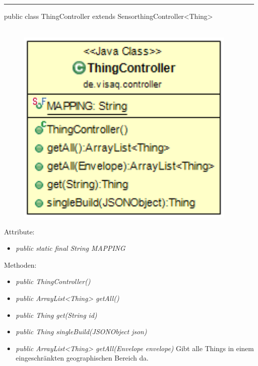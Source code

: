 \rule{\textwidth}{0.4pt}
public class ThingController extends SensorthingController<Thing>
\\\\
\begin{minipage}{0.4\textwidth}
    \begin{figure}[H]
        {\centering\includegraphics[width=0.95\textwidth]{media/backend/controller/classes/ThingController.png}}
    \end{figure}
    \end{minipage} \hfill
\begin{minipage}{0.6\textwidth}
\end{minipage}

Attribute:
\begin{itemize}
    \item \emph{public static final String MAPPING} \mappingDescription
\end{itemize}
Methoden:
\begin{itemize}
    \item \emph{public ThingController()}
    \item \emph{public ArrayList<Thing> getAll()}
    \extendsSensorthingController
    \item \emph{public Thing get(String id)}
    \extendsSensorthingController
    \item \emph{public Thing singleBuild(JSONObject json)}
    \extendsSensorthingController
    \item \emph{public ArrayList<Thing> getAll(Envelope envelope)}
    Gibt alle Things in einem eingeschränkten geographischen Bereich da.
\end{itemize}

